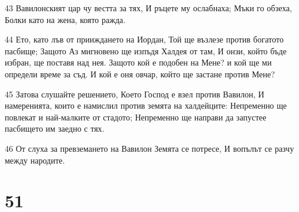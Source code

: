 \par 43 Вавилонският цар чу вестта за тях, И ръцете му ослабнаха; Мъки го обзеха, Болки като на жена, която ражда.
\par 44 Ето, като лъв от прииждането на Иордан, Той ще възлезе против богатото пасбище; Защото Аз мигновено ще изпъдя Халдея от там, И онзи, който бъде избран, ще поставя над нея. Защото кой е подобен на Мене? и кой ще ми определи време за съд. И кой е оня овчар, който ще застане против Мене?
\par 45 Затова слушайте решението, Което Господ е взел против Вавилон, И намеренията, които е намислил против земята на халдейците: Непременно ще повлекат и най-малките от стадото; Непременно ще направи да запустее пасбището им заедно с тях.
\par 46 От слуха за превземането на Вавилон Земята се потресе, И вопълът се разчу между народите.

\chapter{51}

